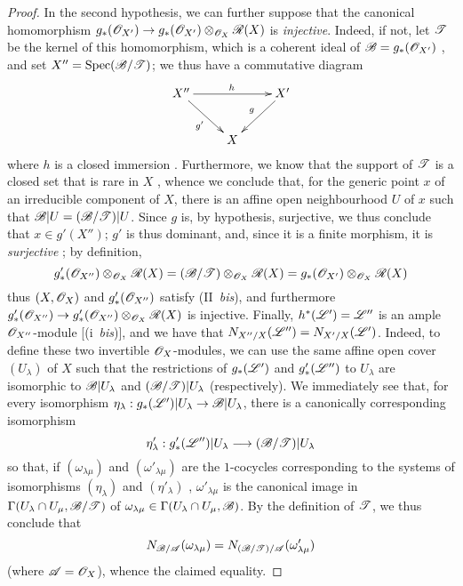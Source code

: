 \begin{proof}
In the second hypothesis, we can further suppose that the canonical homomorphism $g_*(\sh{O}_{X'})\to g_*(\sh{O}_{X'})\otimes_{\sh{O}_X}\sh{R}(X)$ is \emph{injective}.
Indeed, if not, let $\mathscr{T}$ be the kernel of this homomorphism, which is a coherent ideal of $\mathscr{B}=g_*(\mathscr{O}_{X'})$ , and set $X''=\operatorname{Spec}(\mathscr{B}/\mathscr{T})$;
we thus have a commutative diagram
\[
  \xymatrix{
    X'' \ar[rr]^{h} \ar[dr]_{g'}
    && X' \ar[dl]_{g}
  \\&X
  }
\]
where $h$ is a closed immersion .
Furthermore, we know that the support of $\mathscr{T}$ is a closed set  that is rare in $X$ , whence we conclude that, for the generic point $x$ of an irreducible component of $X$, there is an affine open neighbourhood $U$ of $x$ such that $\mathscr{B}|U=(\mathscr{B}/\mathscr{T})|U$.
Since $g$ is, by hypothesis, surjective, we thus conclude that $x\in g'(X'')$;
$g'$ is thus dominant, and, since it is a finite morphism, it is \emph{surjective} ;
by definition,
\[
  g'_*(\mathscr{O}_{X''})\otimes_{\mathscr{O}_X}\mathscr{R}(X)
  = (\mathscr{B}/\mathscr{T})\otimes_{\mathscr{O}_X}\mathscr{R}(X)
  = g_*(\mathscr{O}_{X'})\otimes_{\mathscr{O}_X}\mathscr{R}(X)
\]
thus $(X,\mathscr{O}_X)$ and $g'_*(\mathscr{O}_{X''})$ satisfy (II~\emph{bis}), and furthermore $g'_*(\sh{O}_{X''})\to g'_*(\sh{O}_{X''})\otimes_{\sh{O}_X}\sh{R}(X)$ is injective.
Finally, $h^*(\mathscr{L}')=\mathscr{L}''$ is an ample $\mathscr{O}_{X''}$-module [(i~\emph{bis})], and we have that $N_{X''/X}(\mathscr{L}'')=N_{X'/X}(\mathscr{L}')$.
Indeed, to define these two invertible $\mathscr{O}_X$-modules, we can use the same affine open cover $(U_\lambda)$ of $X$ such that the restrictions of $g_*(\mathscr{L}')$ and $g'_*(\mathscr{L}'')$ to $U_\lambda$ are isomorphic to $\mathscr{B}|U_\lambda$ and $(\mathscr{B}/\mathscr{T})|U_\lambda$ (respectively).
We immediately see that, for every isomorphism $\eta_\lambda:g_*(\sh{L}')|U_\lambda\to\sh{B}|U_\lambda$, there is a canonically corresponding isomorphism
\[
  \eta'_\lambda : g'_*(\sh{L}'')|U_\lambda \to (\sh{B}/\sh{T})|U_\lambda
\]
so that, if $(\omega_{\lambda\mu})$ and $(\omega'_{\lambda\mu})$ are the $1$-cocycles corresponding to the systems of isomorphisms $(\eta_\lambda)$ and $(\eta'_\lambda)$ , $\omega'_{\lambda\mu}$ is the canonical image in $\Gamma(U_\lambda\cap U_\mu,\mathscr{B}/\mathscr{T})$ of $\omega_{\lambda\mu}\in\Gamma(U_\lambda\cap U_\mu,\mathscr{B})$.
By the definition of $\mathscr{T}$, we thus conclude that
\[
  N_{\mathscr{B}/\mathscr{A}}(\omega_{\lambda\mu}) = N_{(\mathscr{B}/\mathscr{T})/\mathscr{A}}(\omega'_{\lambda\mu})
\]
(where $\mathscr{A}=\mathscr{O}_X$), whence the claimed equality.


\end{proof}
